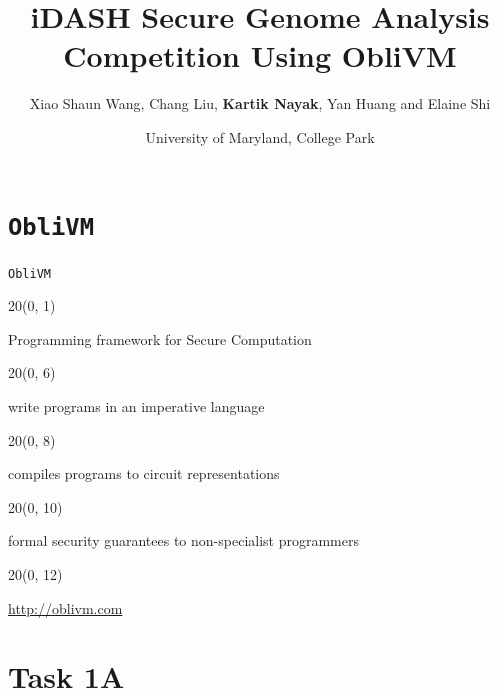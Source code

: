 \documentclass[t,ignorenonframetext]{beamer}
\title[]{iDASH Secure Genome Analysis Competition Using ObliVM}
\author[]{Xiao Shaun Wang, Chang Liu, \textbf{Kartik Nayak}, Yan Huang and Elaine Shi}
\date{University of Maryland, College Park}
\newcommand\myblock[4]{%
\begin{textblock}{#1}(#2, #3)%
  \begin{center}
    #4
  \end{center}
\end{textblock}
}
\newcommand\leftblock[4]{%
\begin{textblock}{#1}(#2, #3)%
  \vspace*{\fill}
    #4
  \vspace*{\fill}
\end{textblock}
}
\begin{document}
\frame{
\maketitle
}

\section{{\tt ObliVM}}

\begin{frame}{{\tt ObliVM}}
\myblock{20}{0}{1}{
\LARGE{Programming framework for Secure Computation}
}
\pause
\leftblock{20}{0}{6}{
{\color{green}{ \Large Ease-of-use:} }write programs in an imperative language
}
\pause
\leftblock{20}{0}{8}{
{\color{green}{\Large Efficiency:} }compiles programs to circuit representations
}
\pause
\leftblock{20}{0}{10}{
{\color{green}{\Large Formal Security:} }formal security guarantees to non-specialist programmers
}
\myblock{20}{0}{12}{
{\LARGE{\url{http://oblivm.com}}}
}
\end{frame}
\section{Task 1A}
\end{document}
